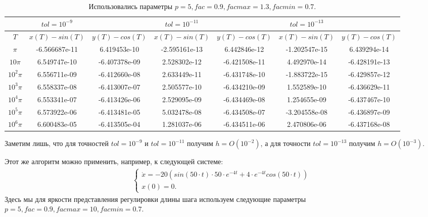 \documentclass[a4paper,12pt]{article}
\begin{document}
	\begin{table}[H]
		\begin{center}
		  \begin{tabular}{|c|c|c|c|c|c|c|}
			  \hline
			  &$tol=10^{-9}$&&$tol=10^{-11}$&&$tol=10^{-13}$&\\
			  \hline
			  $T$&$x(T)-sin(T)$&$y(T)-cos(T)$&$x(T)-sin(T)$&$y(T)-cos(T)$&$x(T)-sin(T)$&$y(T)-cos(T)$\\
			  \hline
			  $\pi$&-6.566687e-11&6.419453e-10&-2.595161e-13&6.442846e-12&-1.202547e-15&6.439294e-14\\
			  \hline
			  $10\pi$&6.549747e-10&-6.407378e-09&2.528302e-12&-6.421508e-11&4.492970e-14&-6.428191e-13\\
			  \hline
			  $10^2\pi$&6.556711e-09&-6.412660e-08&2.633449e-11&-6.431748e-10&-1.883722e-15&-6.429857e-12\\
			  \hline
			  $10^3\pi$&6.558337e-08&-6.413007e-07&2.505577e-10&-6.434210e-09&1.552589e-10&-6.436629e-11\\
			  \hline
			  $10^4\pi$&6.553341e-07&-6.413426e-06&2.529095e-09&-6.434469e-08&1.254655e-09&-6.437467e-10\\
			  \hline
			  $10^5\pi$&6.573922e-06&-6.413481e-05&5.032478e-08&-6.434508e-07&-3.204558e-08&-6.436897e-09\\
			  \hline
			  $10^6\pi$&6.600483e-05&-6.413505e-04&1.281037e-06&-6.434511e-06&2.470806e-06&-6.437168e-08\\
			  \hline
		  \end{tabular}
		\end{center}
		\caption{Использовались параметры $p=5 ,fac=0.9 ,facmax=1.3 ,facmin=0.7$.}
	  \end{table}
	  \FloatBarrier

	  Заметим лишь, что для точностей $tol=10^{-9}$ и $tol=10^{-11}$ получим $h=O(10^{-2})$, а для точности $tol=10^{-13}$ получим $h=O(10^{-3}).$

	Этот же алгоритм можно применить, например, к следующей системе:
	\begin{align*}
	\left\{
		\begin{array}{c}
		\dot x=-20( sin(50\cdot t)\cdot50\cdot e^{-4t} + 4\cdot e^{-4t}cos(50\cdot t))
		\\
		x(0)=0.
		\end{array}
	\right.
	\end{align*}
	Здесь мы для яркости представления регулировки длины шага используем следующие параметры $p=5, fac=0.9, facmax=10, facmin=0.7.$
	
\end{document}
